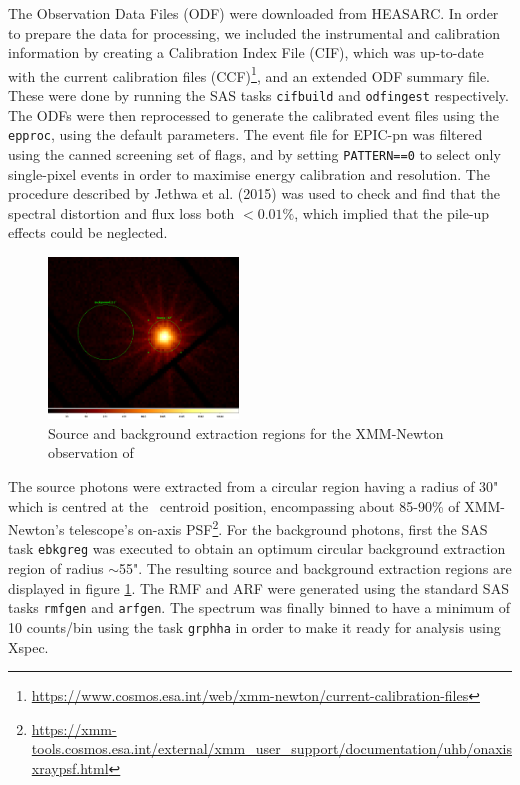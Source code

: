     	The Observation Data Files (ODF) were downloaded from HEASARC. In order to prepare the data for processing, we included the instrumental and calibration information by creating a Calibration Index File (CIF), which was up-to-date with the current calibration files (CCF)\footnote{\url{https://www.cosmos.esa.int/web/xmm-newton/current-calibration-files}}, and an extended ODF summary file. These were done by running the SAS tasks \texttt{cifbuild} and \texttt{odfingest} respectively. The ODFs were then reprocessed to generate the calibrated event files using the \texttt{epproc}, using the default parameters. The event file for EPIC-pn was filtered using the canned screening set of flags, and by setting \texttt{PATTERN==0} to select only single-pixel events in order to maximise energy calibration and resolution. The procedure described by Jethwa et al. (2015) \cite{jethwa2015pile} was used to check and find that the spectral distortion and flux loss both $<0.01\%$, which implied that the pile-up effects could be neglected.
	    \begin{figure}[!htb]
	        \centering
	        \includegraphics[width=0.45\textwidth]{figures/rx-j0925.7-4758_0111150101_src-bkg.png}
	        \caption{Source and background extraction regions for the XMM-Newton observation of \source}
	        \label{fig:src-bkg:pn}
	    \end{figure}
    
    	The source photons were extracted from a circular region having a radius of 30" which is centred at the \source\ centroid position, encompassing about 85-90\% of XMM-Newton's telescope's on-axis PSF\footnote{\url{https://xmm-tools.cosmos.esa.int/external/xmm_user_support/documentation/uhb/onaxisxraypsf.html}}. For the background photons, first the SAS task \texttt{ebkgreg} was executed to obtain an optimum circular background extraction region of radius $\sim$55". The resulting source and background extraction regions are displayed in figure \ref{fig:src-bkg:pn}. The RMF and ARF were generated using the standard SAS tasks \texttt{rmfgen} and \texttt{arfgen}. The spectrum was finally binned to have a minimum of 10 counts/bin using the task \texttt{grphha} in order to make it ready for analysis using Xspec.
    
